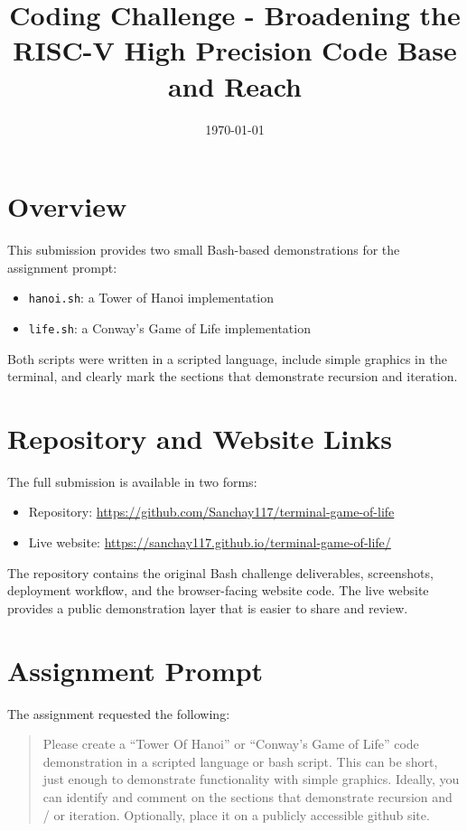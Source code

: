 \documentclass[11pt]{article}
\title{Coding Challenge - Broadening the RISC-V High Precision Code Base and Reach}
\author{}
\date{\today}
\begin{document}
\maketitle

\section{Overview}

This submission provides two small Bash-based demonstrations for the assignment prompt:

\begin{itemize}[leftmargin=1.5em]
  \item \texttt{hanoi.sh}: a Tower of Hanoi implementation
  \item \texttt{life.sh}: a Conway's Game of Life implementation
\end{itemize}

Both scripts were written in a scripted language, include simple graphics in the terminal, and clearly mark the sections that demonstrate recursion and iteration.

\section{Repository and Website Links}

The full submission is available in two forms:

\begin{itemize}[leftmargin=1.5em]
  \item Repository: \url{https://github.com/Sanchay117/terminal-game-of-life}
  \item Live website: \url{https://sanchay117.github.io/terminal-game-of-life/}
\end{itemize}

The repository contains the original Bash challenge deliverables, screenshots, deployment workflow, and the browser-facing website code. The live website provides a public demonstration layer that is easier to share and review.

\section{Assignment Prompt}

The assignment requested the following:

\begin{quote}
Please create a ``Tower Of Hanoi'' or ``Conway's Game of Life'' code demonstration in a scripted language or bash script. This can be short, just enough to demonstrate functionality with simple graphics. Ideally, you can identify and comment on the sections that demonstrate recursion and / or iteration. Optionally, place it on a publicly accessible github site.
\end{quote}
\end{document}
